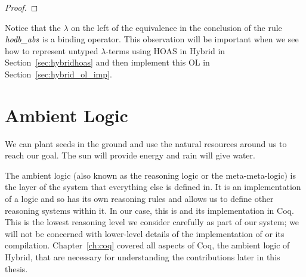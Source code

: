 \begin{expl}
\begin{proof}
\end{proof}

Notice that the $\lambda$ on the left of the equivalence in the conclusion of the rule $\textit{hodb\_abs}$ is a binding operator. This observation will be important when we see how to represent untyped $\lambda$-terms using HOAS in Hybrid in Section~\ref{sec:hybridhoas} and then implement this OL in Section~\ref{sec:hybrid_ol_imp}.

\end{expl}



\section{Ambient Logic}
\label{sec:hybridcoq}

\begin{sidestory}
We can plant seeds in the ground and use the natural resources around us to reach our goal. The sun will provide energy and rain will give water.
\end{sidestory}

The ambient logic (also known as the reasoning logic or the meta-meta-logic) is the layer of the system that everything else is defined in. It is an implementation of a logic and so has its own reasoning rules and allows us to define other reasoning systems within it. In our case, this is \cic{} and its implementation in Coq. This is the lowest reasoning level we consider carefully as part of our system; we will not be concerned with lower-level details of the implementation of \cic{} or its compilation. Chapter~\ref{ch:coq} covered all aspects of Coq, the ambient logic of Hybrid, that are necessary for understanding the contributions later in this thesis.

